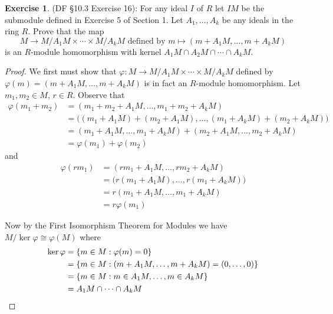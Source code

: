 \documentclass[8pt]{amsart}
\theoremstyle{plain}%
\theoremstyle{definition}
\newtheorem*{exercise}{Exercise}%
\theoremstyle{remark}
\numberwithin{equation}{section}
\begin{document}
\begin{exercise}
(DF \S 10.3 Exercise 16): For any ideal $I$ of $R$ let $IM$ be the submodule defined in Exercise 5 of Section 1. Let $A_1, \ldots, A_k$ be any ideals in the ring $R$. Prove that the map $$M \to M/A_1M \times \cdots \times M/A_kM \text{ defined by } m \mapsto (m + A_1M, \ldots, m + A_kM)$$ is an $R$-module homomorphism with kernel $A_1M \cap A_2M \cap \cdots \cap A_kM$.
	\begin{proof}
		We first must show that $\varphi : M \to M/A_1M \times \cdots \times M/A_kM$ defined by $\varphi(m) = (m + A_1M, \ldots, m + A_kM)$ is in fact an $R$-module homomorphism. Let $m_1, m_2 \in M$, $r \in R$. Observe that
		\begin{align*}
			\varphi(m_1 + m_2) &= (m_1 + m_2 + A_1M, \ldots, m_1 + m_2 + A_kM)\\
			&= \big((m_1 + A_1M) + (m_2 + A_1M), \ldots, (m_1 + A_kM) + (m_2 + A_kM)\big)\\
			&= (m_1 + A_1M, \ldots, m_1 + A_kM) + (m_2 + A_1M, \ldots, m_2 + A_kM)\\
			&= \varphi(m_1) + \varphi(m_2)
		\end{align*}
		and
		\begin{align*}
			\varphi(rm_1) &= (rm_1 + A_1M, \ldots, rm_2 + A_kM)\\
			&= \big(r(m_1 + A_1M), \ldots, r(m_1 + A_kM)\big)\\
			&= r(m_1 + A_1M, \ldots, m_1 + A_kM)\\
			&= r\varphi(m_1)
		\end{align*}
		
		Now by the First Isomorphism Theorem for Modules we have $M/\ker \varphi \cong \varphi(M)$ where
		\begin{align*}
			\ker \varphi &= \{m \in M : \varphi(m) = 0\}\\
			&= \{m \in M : (m + A_1M, \ldots, m + A_kM) = (0, \ldots, 0)\}\\
			&= \{m \in M : m \in A_1M, \ldots, m \in A_kM\}\\
			&= A_1M \cap \cdots \cap A_kM \qedhere
		\end{align*}
	\end{proof}
\end{exercise}
\end{document}
